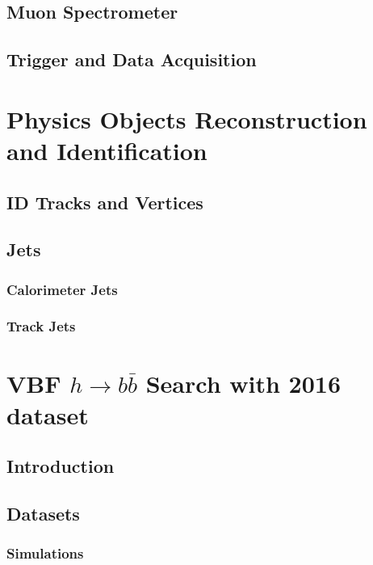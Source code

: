 \documentclass{report}
\begin{document}
\section{Muon Spectrometer}


\section{Trigger and Data Acquisition}


\chapter{Physics Objects Reconstruction and Identification}
\label{chap:reconstruction}


\section{ID Tracks and Vertices}


\section{Jets}
\subsection{Calorimeter Jets}
\subsection{Track Jets}
\clearpage

\chapter{VBF $h\rightarrow b\bar{b}$ Search with 2016 dataset}
\label{chap:vbf}
\section{Introduction}

\clearpage

\section{Datasets}
\subsection{Simulations}

\end{document}
